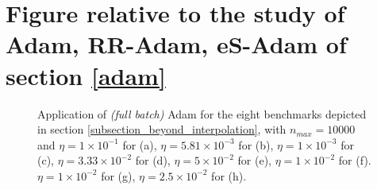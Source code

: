 \documentclass[article,authoryear,jmlmc]{beg_32}             %
\begin{document}
\section{Figure relative to the study of Adam, RR-Adam, eS-Adam of section \ref{adam}}
\begin{figure}[h!]
	\centering
	\scalebox{0.60}{}
        \caption{
          Application of {\em (full batch)} Adam for the eight benchmarks depicted in section \ref{subsection_beyond_interpolation}, with $n_{max}=10000$ and
 $\eta = 1   \times 10^{-1}$  for \exOne    (a),
 $\eta = 5.81\times 10^{-3}$  for \exTwo    (b),
 $\eta = 1   \times 10^{-3}$  for \exThree  (c),
 $\eta = 3.33\times 10^{-2}$  for \exFour   (d),
 $\eta = 5   \times 10^{-2}$  for \exFive   (e),
 $\eta = 1   \times 10^{-2}$  for \exSix    (f).
 $\eta = 1   \times 10^{-2}$  for \exSeven  (g),
 $\eta = 2.5 \times 10^{-2}$  for \exHeight (h).
}
	\label{adam_fb_exs}
\end{figure}

\clearpage

\section{}
\label{pseudo_code}
\end{document}

